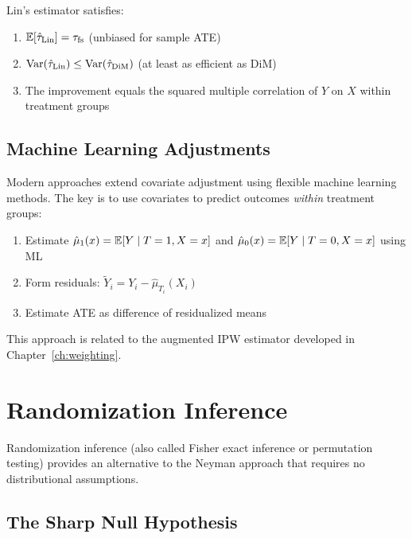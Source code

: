 \begin{theorem}
Lin's estimator satisfies:
\begin{enumerate}
    \item $\mathbb{E}[\hat{\tau}_{\text{Lin}}] = \tau_{\text{fs}}$ (unbiased for sample ATE)
    \item $\mathrm{Var}(\hat{\tau}_{\text{Lin}}) \leq \mathrm{Var}(\hat{\tau}_{\text{DiM}})$ (at least as efficient as DiM)
    \item The improvement equals the squared multiple correlation of $Y$ on $X$ within treatment groups
\end{enumerate}
\end{theorem}

\subsection{Machine Learning Adjustments}

Modern approaches extend covariate adjustment using flexible machine learning methods. The key is to use covariates to predict outcomes \emph{within} treatment groups:

\begin{enumerate}
    \item Estimate $\hat{\mu}_1(x) = \mathbb{E}[Y \mid T=1, X=x]$ and $\hat{\mu}_0(x) = \mathbb{E}[Y \mid T=0, X=x]$ using ML
    \item Form residuals: $\tilde{Y}_i = Y_i - \hat{\mu}_{T_i}(X_i)$
    \item Estimate ATE as difference of residualized means
\end{enumerate}

This approach is related to the augmented IPW estimator developed in Chapter~\ref{ch:weighting}.


\section{Randomization Inference}
\label{sec:rand_inference}

Randomization inference (also called Fisher exact inference or permutation testing) provides an alternative to the Neyman approach that requires no distributional assumptions.

\subsection{The Sharp Null Hypothesis}

